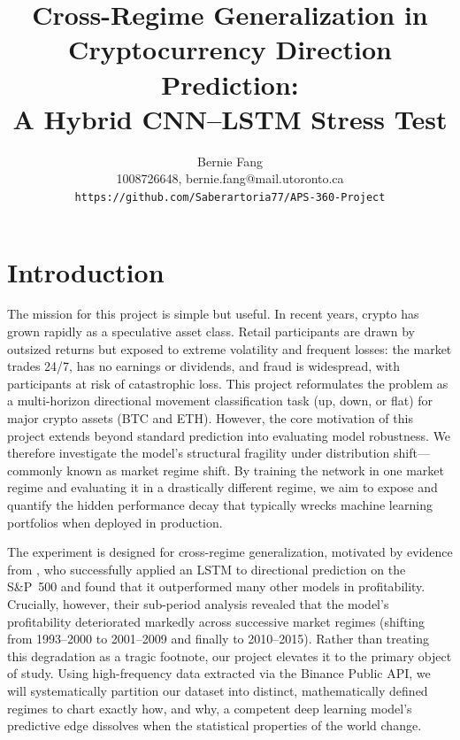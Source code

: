 \documentclass{article}
\title{Cross-Regime Generalization in Cryptocurrency Direction Prediction:\\A Hybrid CNN--LSTM Stress Test}
\author{%
  Bernie Fang \\
  1008726648, bernie.fang@mail.utoronto.ca \\
  \texttt{https://github.com/Saberartoria77/APS-360-Project} \\
}
\begin{document}
\maketitle
\vspace{-3.8em}

\section{Introduction}
The mission for this project is  simple but useful. In recent years, crypto has grown rapidly as a
speculative asset class. Retail participants are drawn by outsized returns but exposed to extreme
volatility and frequent losses: the market trades 24/7, has no earnings or dividends, and fraud is
widespread, with participants at risk of catastrophic loss. This project reformulates the problem as a
multi-horizon directional movement classification task (up, down, or flat) for major crypto assets
(BTC and ETH). However, the core motivation of this project extends beyond standard prediction into
evaluating model robustness. We therefore investigate the model's structural fragility under
distribution shift---commonly known as market regime shift. By training the network in one market
regime and evaluating it in a drastically different regime, we aim to expose and quantify the hidden
performance decay that typically wrecks machine learning portfolios when deployed in production.

The experiment is designed for cross-regime generalization, motivated by evidence from
\citet{fischer2018deep}, who successfully applied an LSTM to directional prediction on the S\&P~500 and
found that it outperformed many other models in profitability. Crucially, however, their sub-period
analysis revealed that the model's profitability deteriorated markedly across successive market regimes
(shifting from 1993--2000 to 2001--2009 and finally to 2010--2015). Rather than treating this
degradation as a tragic footnote, our project elevates it to the primary object of study. Using
high-frequency data extracted via the Binance Public API, we will systematically partition our dataset
into distinct, mathematically defined regimes to chart exactly how, and why, a competent deep learning
model's predictive edge dissolves when the statistical properties of the world change.
\end{document}
